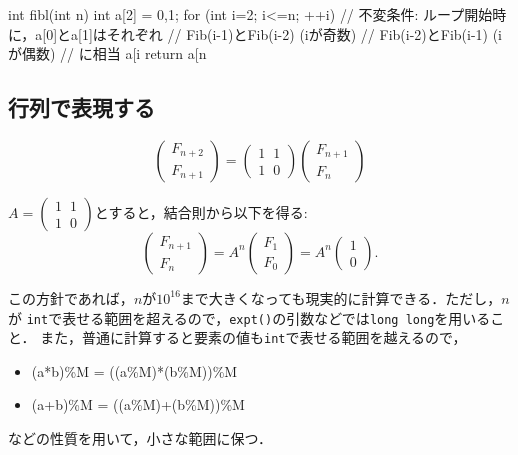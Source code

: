 \begin{cbox}
int fibl(int n) {
    int a[2] = {0,1};
    for (int i=2; i<=n; ++i) {
        // 不変条件: ループ開始時に，a[0]とa[1]はそれぞれ
        //   Fib(i-1)とFib(i-2) (iが奇数)
        //   Fib(i-2)とFib(i-1) (iが偶数)
        // に相当
        a[i
    }
    return a[n
}
\end{cbox}

\subsection{行列で表現する}

$$\left(
\begin{array}{cc}
  F_{n+2} \\ F_{n+1}
\end{array}\right)
 = 
\left(\begin{array}{cc}
  1 \phantom{x} 1 \\ 1 \phantom{x} 0
\end{array}\right)
\left(\begin{array}{cc}
  F_{n+1} \\ F_n
\end{array}\right)
$$

$A = \left(\begin{array}{cc}
  1 \phantom{x} 1 \\ 1 \phantom{x} 0
\end{array}\right)$とすると，結合則から以下を得る:
$$\left(
\begin{array}{cc}
  F_{n+1} \\ F_{n}
\end{array}\right)
 = A^n
\left(\begin{array}{cc}
  F_{1} \\ F_0
\end{array}\right)
 = A^n
\left(\begin{array}{cc}
  1 \\ 0
\end{array}\right).
$$

この方針であれば，$n$が$10^{16}$まで大きくなっても現実的に計算できる．ただし，$n$が
\texttt{int}で表せる範囲を超えるので，\texttt{expt()}の引数などでは\texttt{long long}を用いること．
また，普通に計算すると要素の値も\texttt{int}で表せる範囲を越えるので，
\begin{itemize}
\item (a*b)\%M = ((a\%M)*(b\%M))\%M
\item (a+b)\%M = ((a\%M)+(b\%M))\%M
\end{itemize}
などの性質を用いて，小さな範囲に保つ．

